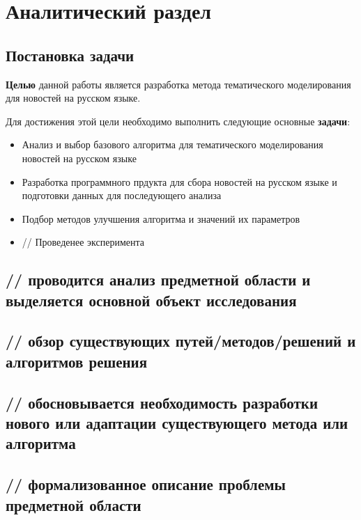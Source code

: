 \chapter{Аналитический раздел}

%
\section{Постановка задачи}
\textbf{Целью} данной работы является разработка метода тематического моделирования для новостей на русском языке.

Для достижения этой цели необходимо выполнить следующие основные \textbf{задачи}:

\begin{itemize}
    \item Анализ и выбор базового алгоритма для тематического моделирования новостей на русском языке
    \item Разработка программного прдукта для сбора новостей на русском языке и подготовки данных для последующего анализа
    \item Подбор методов улучшения алгоритма и значений их параметров
    \item // Проведенее эксперимента
\end{itemize}

%
\section{// проводится анализ предметной области и выделяется основной объект исследования}

%
\section{// обзор существующих путей/методов/решений и алгоритмов решения}


%
\section{// обосновывается необходимость разработки нового или адаптации существующего метода или алгоритма}

%
\section{// формализованное описание проблемы предметной области}

